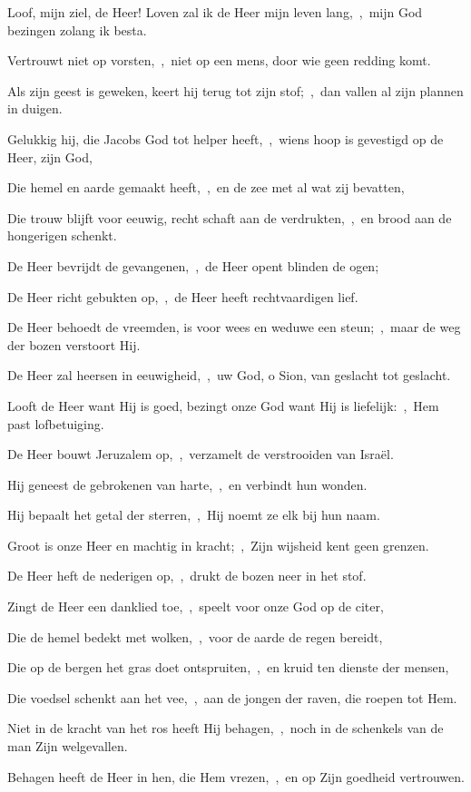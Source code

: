 \documentclass[12pt,twoside,a5paper]{article}
\begin{document}
\begin{halfparskip}
   Loof, mijn ziel, de Heer! Loven zal ik de Heer mijn leven lang,~\sep\ mijn God bezingen zolang ik besta.

  Vertrouwt niet op vorsten,~\sep\ niet op een mens, door wie geen redding komt.

  Als zijn geest is geweken, keert hij terug tot zijn stof;~\sep\ dan vallen al zijn plannen in duigen.

  Gelukkig hij, die Jacobs God tot helper heeft,~\sep\ wiens hoop is gevestigd op de Heer, zijn God,

  Die hemel en aarde gemaakt heeft,~\sep\ en de zee met al wat zij bevatten,

  Die trouw blijft voor eeuwig, recht schaft aan de verdrukten,~\sep\ en brood aan de hongerigen schenkt.

  De Heer bevrijdt de gevangenen,~\sep\ de Heer opent blinden de ogen;

  De Heer richt gebukten op,~\sep\ de Heer heeft rechtvaardigen lief.

  De Heer behoedt de vreemden, is voor wees en weduwe een steun;~\sep\ maar de weg der bozen verstoort Hij.

  De Heer zal heersen in eeuwigheid,~\sep\ uw God, o Sion, van geslacht tot geslacht.
\end{halfparskip}

\begin{halfparskip}
   Looft de Heer want Hij is goed, bezingt onze God want Hij is liefelijk:~\sep\ Hem past lofbetuiging.

  De Heer bouwt Jeruzalem op,~\sep\ verzamelt de verstrooiden van Israël.

  Hij geneest de gebrokenen van harte,~\sep\ en verbindt hun wonden.

  Hij bepaalt het getal der sterren,~\sep\ Hij noemt ze elk bij hun naam.

  Groot is onze Heer en machtig in kracht;~\sep\ Zijn wijsheid kent geen grenzen.

  De Heer heft de nederigen op,~\sep\ drukt de bozen neer in het stof.

  Zingt de Heer een danklied toe,~\sep\ speelt voor onze God op de citer,

  Die de hemel bedekt met wolken,~\sep\ voor de aarde de regen bereidt,

  Die op de bergen het gras doet ontspruiten,~\sep\ en kruid ten dienste der mensen,

  Die voedsel schenkt aan het vee,~\sep\ aan de jongen der raven, die roepen tot Hem.

  Niet in de kracht van het ros heeft Hij behagen,~\sep\ noch in de schenkels van de man Zijn welgevallen.

  Behagen heeft de Heer in hen, die Hem vrezen,~\sep\ en op Zijn goedheid vertrouwen.
\end{halfparskip}
\end{document}
